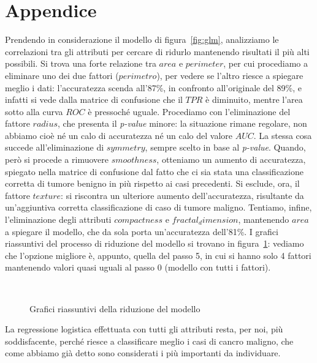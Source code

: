 \documentclass[11pt,a4paper,oneside]{article}
\begin{document}
\section{Appendice}
Prendendo in considerazione il modello di figura~\vref{fig:glm}, analizziamo le correlazioni tra gli attributi per cercare di ridurlo mantenendo risultati il più alti possibili. Si trova una forte relazione tra $area$ e $perimeter$, per cui procediamo a eliminare uno dei due fattori ($perimetro$), per vedere se l'altro riesce a spiegare meglio i dati: l'accuratezza scenda all'87\%, in confronto all'originale del 89\%, e infatti si vede dalla matrice di confusione che il $TPR$ è diminuito, mentre l'area sotto alla curva $ROC$ è pressoché uguale. Procediamo con l'eliminazione del fattore $radius$, che presenta il \textit{p-value} minore: la situazione rimane regolare, non abbiamo cioè né un calo di accuratezza né un calo del valore $AUC$. La stessa cosa succede all'eliminazione di $symmetry$, sempre scelto in base al \textit{p-value}. Quando, però si procede a rimuovere $smoothness$, otteniamo un aumento di accuratezza, spiegato nella matrice di confusione dal fatto che ci sia stata una classificazione corretta di tumore benigno in più rispetto ai casi precedenti. Si esclude, ora, il fattore $texture$: si riscontra un ulteriore aumento dell'accuratezza, risultante da un'aggiuntiva corretta classificazione di caso di tumore maligno. Tentiamo, infine, l'eliminazione degli attributi $compactness$ e $fractal_dimension$, mantenendo $area$ a spiegare il modello, che da sola porta un'accuratezza dell'81\%. I grafici riassuntivi del processo di riduzione del modello si trovano in figura~\ref{fig:riduzioni}: vediamo che l'opzione migliore è, appunto, quella del passo 5, in cui si hanno solo 4 fattori mantenendo valori quasi uguali al passo 0 (modello con tutti i fattori). 
\begin{figure}[h]
\centering
{}
 \\
\caption{Grafici riassuntivi della riduzione del modello}
\label{fig:riduzioni}
\end{figure}

La regressione logistica effettuata con tutti gli attributi resta, per noi, più soddisfacente, perché riesce a classificare meglio i casi di cancro maligno, che come abbiamo già detto sono considerati i più importanti da individuare.
\end{document}
